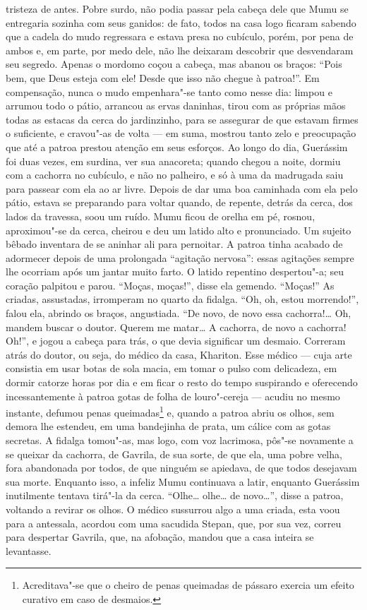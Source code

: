 tristeza de antes. Pobre surdo, não podia passar pela cabeça dele que
Mumu se entregaria sozinha com seus ganidos: de fato, todos na casa logo
ficaram sabendo que a cadela do mudo regressara e estava presa no
cubículo, porém, por pena de ambos e, em parte, por medo dele, não lhe
deixaram descobrir que desvendaram seu segredo. Apenas o mordomo coçou a
cabeça, mas abanou os braços: ``Pois bem, que Deus esteja com ele! Desde
que isso não chegue à patroa!''. Em compensação, nunca o mudo
empenhara"-se tanto como nesse dia: limpou e arrumou todo o pátio,
arrancou as ervas daninhas, tirou com as próprias mãos todas as estacas
da cerca do jardinzinho, para se assegurar de que estavam firmes o
suficiente, e cravou"-as de volta --- em suma, mostrou tanto zelo e
preocupação que até a patroa prestou atenção em seus esforços. Ao longo
do dia, Guerássim foi duas vezes, em surdina, ver sua anacoreta; quando
chegou a noite, dormiu com a cachorra no cubículo, e não no palheiro, e
só à uma da madrugada saiu para passear com ela ao ar livre. Depois de
dar uma boa caminhada com ela pelo pátio, estava se preparando para
voltar quando, de repente, detrás da cerca, dos lados da travessa, soou
um ruído. Mumu ficou de orelha em pé, rosnou, aproximou"-se da cerca,
cheirou e deu um latido alto e pronunciado. Um sujeito bêbado inventara
de se aninhar ali para pernoitar. A patroa tinha acabado de adormecer
depois de uma prolongada ``agitação nervosa'': essas agitações sempre
lhe ocorriam após um jantar muito farto. O latido repentino despertou"-a;
seu coração palpitou e parou. ``Moças, moças!'', disse ela gemendo.
``Moças!'' As criadas, assustadas, irromperam no quarto da fidalga.
``Oh, oh, estou morrendo!'', falou ela, abrindo os braços, angustiada.
``De novo, de novo essa cachorra!\ldots{} Oh, mandem buscar o doutor. Querem
me matar\ldots{} A cachorra, de novo a cachorra! Oh!'', e jogou a cabeça para
trás, o que devia significar um desmaio. Correram atrás do doutor, ou
seja, do médico da casa, Khariton. Esse médico --- cuja arte consistia
em usar botas de sola macia, em tomar o pulso com delicadeza, em dormir
catorze horas por dia e em ficar o resto do tempo suspirando e
oferecendo incessantemente à patroa gotas de folha de louro"-cereja ---
acudiu no mesmo instante, defumou penas queimadas\footnote{Acreditava"-se
  que o cheiro de penas queimadas de pássaro exercia um efeito curativo
  em caso de desmaios.} e, quando a patroa abriu os olhos, sem demora
lhe estendeu, em uma bandejinha de prata, um cálice com as gotas
secretas. A fidalga tomou"-as, mas logo, com voz lacrimosa, pôs"-se
novamente a se queixar da cachorra, de Gavrila, de sua sorte, de que
ela, uma pobre velha, fora abandonada por todos, de que ninguém se
apiedava, de que todos desejavam sua morte. Enquanto isso, a infeliz
Mumu continuava a latir, enquanto Guerássim inutilmente tentava tirá"-la
da cerca. ``Olhe\ldots{} olhe\ldots{} de novo\ldots{}'', disse a patroa, voltando a
revirar os olhos. O médico sussurrou algo a uma criada, esta voou para a
antessala, acordou com uma sacudida Stepan, que, por sua vez, correu
para despertar Gavrila, que, na afobação, mandou que a casa inteira se
levantasse.

